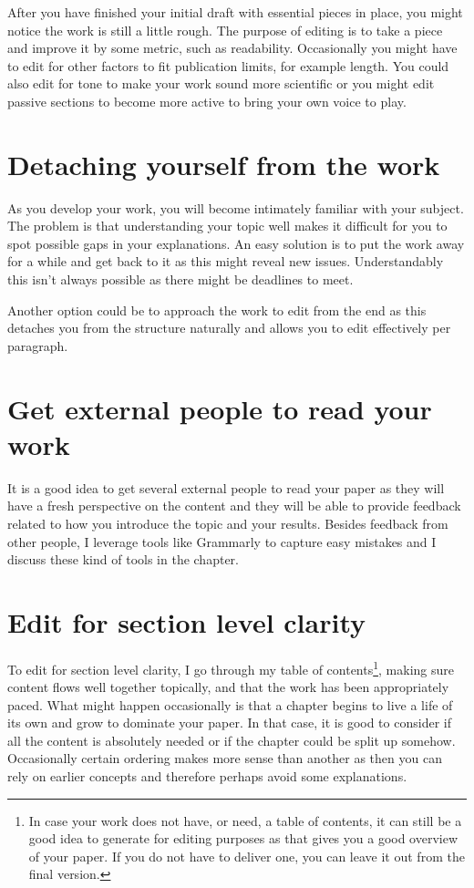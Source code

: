 After you have finished your initial draft with essential pieces in place, you might notice the work is still a little rough.
The purpose of editing is to take a piece and improve it by some metric, such as readability.
Occasionally you might have to edit for other factors to fit publication limits, for example length.
You could also edit for tone to make your work sound more scientific or you might edit passive sections to become more active to bring your own voice to play.

\section{Detaching yourself from the work}

As you develop your work, you will become intimately familiar with your subject.
The problem is that understanding your topic well makes it difficult for you to spot possible gaps in your explanations.
An easy solution is to put the work away for a while and get back to it as this might reveal new issues.
Understandably this isn't always possible as there might be deadlines to meet.

Another option could be to approach the work to edit from the end as this detaches you from the structure naturally and allows you to edit effectively per paragraph.

\section{Get external people to read your work}

It is a good idea to get several external people to read your paper as they will have a fresh perspective on the content and they will be able to provide feedback related to how you introduce the topic and your results.
Besides feedback from other people, I leverage tools like Grammarly to capture easy mistakes and I discuss these kind of tools in the  chapter.

\section{Edit for section level clarity}

To edit for section level clarity, I go through my table of contents\footnote{In case your work does not have, or need, a table of contents, it can still be a good idea to generate for editing purposes as that gives you a good overview of your paper. If you do not have to deliver one, you can leave it out from the final version.}, making sure content flows well together topically, and that the work has been appropriately paced.
What might happen occasionally is that a chapter begins to live a life of its own and grow to dominate your paper.
In that case, it is good to consider if all the content is absolutely needed or if the chapter could be split up somehow.
Occasionally certain ordering makes more sense than another as then you can rely on earlier concepts and therefore perhaps avoid some explanations.

